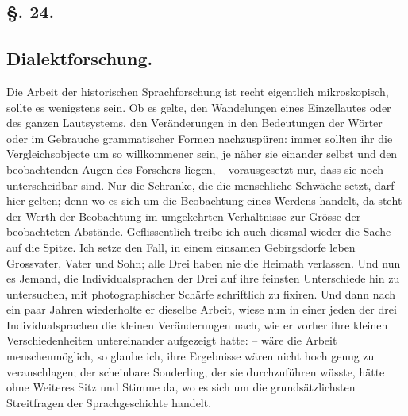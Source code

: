 {

\subsection*{§. 24.}\label{III.II.II.24}
\subsection*{Dialektforschung.}
\largerpage[1]Die Arbeit der historischen Sprachforschung ist recht eigentlich mikroskopisch, sollte es wenigstens sein. Ob es gelte, den Wandelungen eines Einzellautes oder des ganzen Lautsystems, den Veränderungen in den Bedeutungen der Wörter oder im Gebrauche grammatischer Formen nachzuspüren: immer sollten ihr die Vergleichsobjecte um so willkommener sein, je näher sie einander selbst und den beobachtenden Augen des Forschers liegen, – vorausgesetzt nur, dass sie noch unterscheidbar sind. Nur die Schranke, die die menschliche Schwäche setzt, darf hier gelten; denn wo es sich um die Beobachtung eines Werdens handelt, da steht der Werth der Beobachtung im umgekehrten Verhältnisse zur Grösse der beobachteten Abstände. Geflissentlich treibe ich auch diesmal wieder die Sache auf die Spitze. Ich setze den Fall, in einem ein\-\label{sp.284}samen Gebirgsdorfe leben Grossvater, Vater und Sohn; alle Drei haben nie die Heimath verlassen. Und nun  es Jemand, die Individualsprachen der Drei auf ihre feinsten Unterschiede hin zu untersuchen, mit photographischer Schärfe schriftlich zu fixiren. Und dann nach ein paar Jahren wiederholte er dieselbe Arbeit, wiese nun in einer jeden der drei Individualsprachen die kleinen Veränderungen nach, wie er vorher ihre kleinen Verschiedenheiten untereinander aufgezeigt hatte: – wäre die Arbeit menschenmöglich, so glaube ich, ihre Ergebnisse wären nicht hoch genug zu veranschlagen; der scheinbare Sonderling, der sie durchzuführen wüsste, hätte ohne Weiteres Sitz und Stimme da, wo es sich um die grundsätzlichsten Streitfragen der Sprachgeschichte handelt.

}
